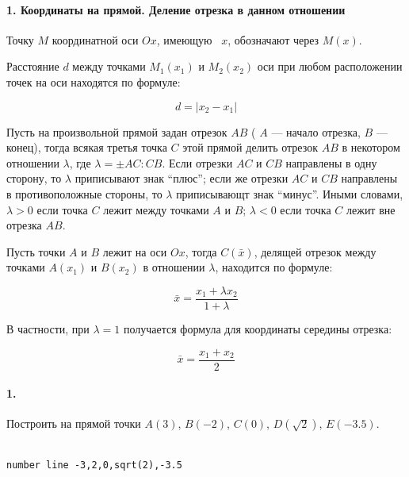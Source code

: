 \secdown


\paragraph{1. Координаты на прямой. Деление отрезка в данном отношении}

Точку $M$ координатной оси $Ox$, имеющую \ $x$,
обозначают через $M(x)$.

Расстояние $d$ между точками $M_{1}(x_{1})$ и $M_{2}(x_{2})$ оси при любом
расположении точек на оси находятся по формуле:

\begin{equation}
d=|x_{2}-x_{1}|
\end{equation}

Пусть на произвольной прямой задан отрезок $AB$ ( $A$ --- начало отрезка, $B$
--- конец), тогда всякая третья точка $C$ этой прямой делить отрезок $AB$ в
некотором отношении $\lambda$, где $\lambda= \pm AC:CB$. Если отрезки $AC$ и
$CB$ направлены в одну сторону, то $\lambda$ приписывают знак ``плюс''; если же
отрезки $AC$ и $CB$ направлены в противоположные стороны, то $\lambda$
приписывающт знак ``минус''. Иными словами, $\lambda>0$ если точка $C$ лежит
между точками $A$ и $B$; $\lambda < 0$ если точка $C$ лежит вне отрезка $AB$.

Пусть точки $A$ и $B$ лежит на оси $Ox$, тогда  $C(\bar{x})$, делящей отрезок между точками $A(x_1)$ и
$B(x_2)$ в отношении $\lambda$, находится по формуле:

\begin{equation}
\bar x=\frac{x_1+\lambda x_2}{1+\lambda}
\end{equation}

В частности, при $\lambda=1$ получается формула для координаты середины отрезка:

\begin{equation}
\bar x = \frac{x_1+x_2}{2}
\end{equation}

\paragraph{1.}

Построить на прямой точки $A(3)$, $B(-2)$, $C(0)$, $D(\sqrt{2})$, $E(-3.5)$.

\bigskip\wolfram\bigskip\\
\verb|number line -3,2,0,sqrt(2),-3.5|


